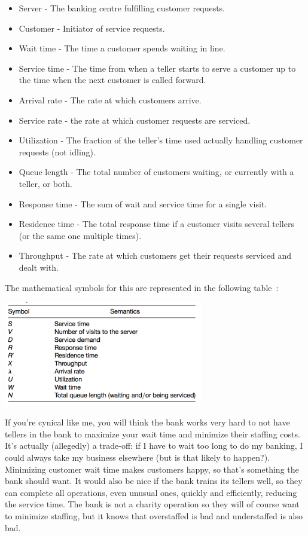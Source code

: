\begin{itemize}
	\item Server - The banking centre fulfilling customer requests.
	\item Customer - Initiator of service requests.
	\item Wait time - The time a customer spends waiting in line.
	\item Service time - The time from when a teller starts to serve a customer up to the time when the next customer is called forward.
	\item Arrival rate - The rate at which customers arrive.
	\item Service rate - the rate at which customer requests are serviced.
	\item Utilization - The fraction of the teller's time used actually handling customer requests (not idling).
	\item Queue length - The total number of customers waiting, or currently with a teller, or both.
	\item Response time - The sum of wait and service time for a single visit.
	\item Residence time - The total response time if a customer visits several tellers (or the same one multiple times).
	\item Throughput - The rate at which customers get their requests serviced and dealt with.
\end{itemize}

The mathematical symbols for this are represented in the following table~\cite{swps}:


\begin{center}
	\includegraphics[width=0.65\textwidth]{images/math-symbols.png}
\end{center}

If you're cynical like me, you will think the bank works very hard to not have tellers in the bank to maximize your wait time and minimize their staffing costs. It's actually (allegedly) a trade-off: if I have to wait too long to do my banking, I could always take my business elsewhere (but is that likely to happen?). Minimizing customer wait time makes customers happy, so that's something the bank should want. It would also be nice if the bank trains its tellers well, so they can complete all operations, even unusual ones, quickly and efficiently, reducing the service time. The bank is not a charity operation so they will of course want to minimize staffing, but it knows that overstaffed is bad and understaffed is also bad. 

